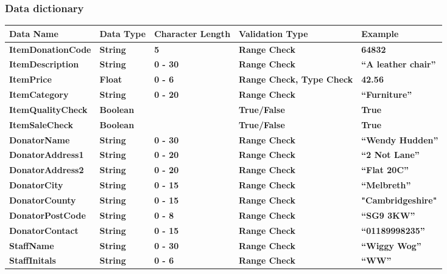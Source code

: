 \subsubsection{Data dictionary}
\begin{tabular}{|p{3.25cm}|p{1.5cm}|p{1.75cm}|p{3cm}|p{3.5cm}|}
\hline
\textbf {Data Name} & \textbf {Data Type} &\textbf {Character Length} &\textbf {Validation Type} &\textbf {Example} \\ \hline
\textbf {ItemDonationCode} & \textbf {String} &\textbf {5} &\textbf {Range Check} &\textbf {64832} \\ \hline
\textbf {ItemDescription} & \textbf {String} &\textbf {0 - 30} &\textbf {Range Check} &\textbf {“A leather chair”} \\ \hline
\textbf {ItemPrice} & \textbf {Float} &\textbf {0 - 6} &\textbf {Range Check, Type Check} &\textbf {42.56} \\ \hline
\textbf {ItemCategory} & \textbf {String} &\textbf {0 - 20} &\textbf {Range Check} &\textbf {“Furniture”} \\ \hline
\textbf {ItemQualityCheck} & \textbf {Boolean} &\textbf {} &\textbf {True/False} &\textbf {True} \\ \hline
\textbf {ItemSaleCheck} & \textbf {Boolean} &\textbf {} &\textbf {True/False} &\textbf {True} \\ \hline
\textbf {DonatorName} & \textbf {String} &\textbf {0 - 30} &\textbf {Range Check} &\textbf {“Wendy Hudden”} \\ \hline
\textbf {DonatorAddress1} & \textbf {String} &\textbf {0 - 20} &\textbf {Range Check} &\textbf {“2 Not Lane”} \\ \hline
\textbf {DonatorAddress2} & \textbf {String} &\textbf {0 - 20} &\textbf {Range Check} &\textbf {“Flat 20C”} \\ \hline
\textbf {DonatorCity} & \textbf {String} &\textbf {0 - 15} &\textbf {Range Check} &\textbf {“Melbreth”} \\ \hline
\textbf {DonatorCounty} & \textbf {String} &\textbf {0 - 15} &\textbf {Range Check} &\textbf {"Cambridgeshire"} \\ \hline
\textbf {DonatorPostCode} & \textbf {String} &\textbf {0 - 8} &\textbf {Range Check} &\textbf {“SG9 3KW”} \\ \hline
\textbf {DonatorContact} & \textbf {String} &\textbf {0 - 15} &\textbf {Range Check} &\textbf {“01189998235”} \\ \hline
\textbf {StaffName} & \textbf {String} &\textbf {0 - 30} &\textbf {Range Check} &\textbf {“Wiggy Wog”} \\ \hline
\textbf {StaffInitals} & \textbf {String} &\textbf {0 - 6} &\textbf {Range Check} &\textbf {“WW”} \\ \hline
\end{tabular}

